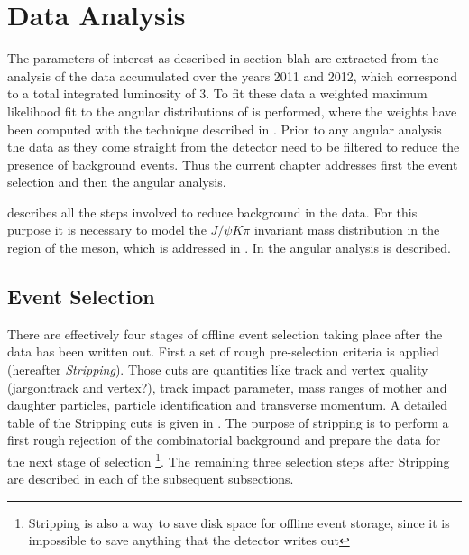 \chapter{Data Analysis}
\label{Data_Analysis}

The parameters of interest as described in  {\color{red} section blah} are extracted from the analysis of the
\runone \lhcb data accumulated over the years 2011 and 2012, which correspond to a total integrated luminosity
of 3\invfb. To fit these data a weighted maximum likelihood fit to the angular distributions of \BsJpsiKst is performed,
where the weights have been computed with the \sPlot technique \cite{splot} described in .
Prior to any angular analysis the data as they come straight from the detector need to be filtered to reduce the presence of 
background events. Thus the current chapter addresses first the event selection and then the angular analysis.

 describes all the steps involved to reduce background in the data. For this purpose
it is necessary to model the $J/\psi K\pi$ invariant mass distribution in the region of the \Bs meson, which
is addressed in . In  the angular analysis is described.\\

\section{Event Selection}
\label{Event_Selection}

There are effectively four stages of offline event selection taking place after the data has been written out. 
First a set of rough pre-selection criteria is applied (hereafter {\it Stripping}). Those cuts are quantities like track and vertex quality {\color{red}(jargon:track and vertex?)},
track impact parameter, mass ranges of mother and daughter particles, particle identification and transverse momentum. A detailed 
table of the Stripping cuts is given in . The purpose of stripping is to perform a first rough rejection of the combinatorial
background and prepare the data for the next stage of selection \footnote{Stripping is also a way to save disk space for offline event storage, since it is impossible
to save anything that the detector writes out}. The remaining three selection steps after Stripping are described in each of the subsequent subsections.

